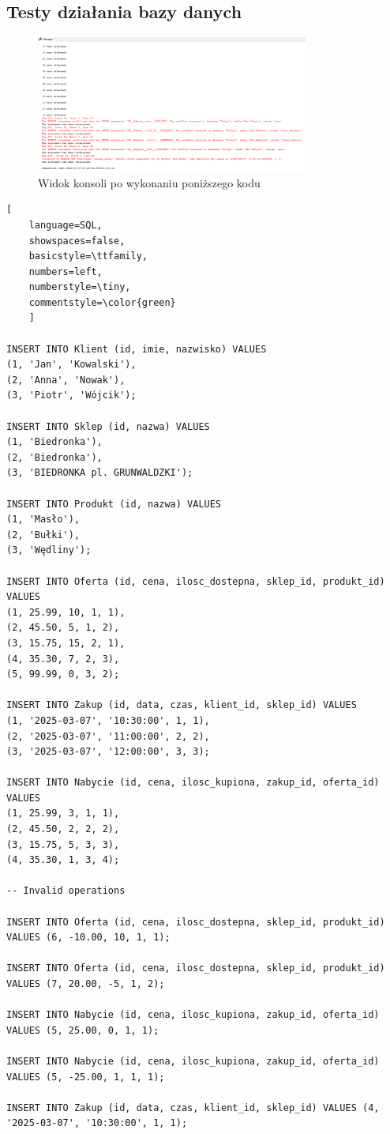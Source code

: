 \documentclass[a4paper,12pt]{article}
\begin{document}
\subsection{Testy działania bazy danych}

\begin{figure}[H]
    \centering
    \includegraphics[width=0.8\textwidth]{images/seeding_console.png}
    \caption{Widok konsoli po wykonaniu poniższego kodu}
    \label{fig:tests}
    \end{figure}

\begin{lstlisting}[
    language=SQL,
    showspaces=false,
    basicstyle=\ttfamily,
    numbers=left,
    numberstyle=\tiny,
    commentstyle=\color{green}
    ]

INSERT INTO Klient (id, imie, nazwisko) VALUES
(1, 'Jan', 'Kowalski'),
(2, 'Anna', 'Nowak'),
(3, 'Piotr', 'Wójcik');

INSERT INTO Sklep (id, nazwa) VALUES
(1, 'Biedronka'),
(2, 'Biedronka'),
(3, 'BIEDRONKA pl. GRUNWALDZKI');

INSERT INTO Produkt (id, nazwa) VALUES
(1, 'Masło'),
(2, 'Bułki'),
(3, 'Wędliny');

INSERT INTO Oferta (id, cena, ilosc_dostepna, sklep_id, produkt_id) VALUES
(1, 25.99, 10, 1, 1),
(2, 45.50, 5, 1, 2),
(3, 15.75, 15, 2, 1),
(4, 35.30, 7, 2, 3),
(5, 99.99, 0, 3, 2);

INSERT INTO Zakup (id, data, czas, klient_id, sklep_id) VALUES
(1, '2025-03-07', '10:30:00', 1, 1),
(2, '2025-03-07', '11:00:00', 2, 2),
(3, '2025-03-07', '12:00:00', 3, 3);

INSERT INTO Nabycie (id, cena, ilosc_kupiona, zakup_id, oferta_id) VALUES
(1, 25.99, 3, 1, 1),
(2, 45.50, 2, 2, 2),
(3, 15.75, 5, 3, 3),
(4, 35.30, 1, 3, 4);

-- Invalid operations

INSERT INTO Oferta (id, cena, ilosc_dostepna, sklep_id, produkt_id) VALUES (6, -10.00, 10, 1, 1);

INSERT INTO Oferta (id, cena, ilosc_dostepna, sklep_id, produkt_id) VALUES (7, 20.00, -5, 1, 2);

INSERT INTO Nabycie (id, cena, ilosc_kupiona, zakup_id, oferta_id) VALUES (5, 25.00, 0, 1, 1);

INSERT INTO Nabycie (id, cena, ilosc_kupiona, zakup_id, oferta_id) VALUES (5, -25.00, 1, 1, 1);

INSERT INTO Zakup (id, data, czas, klient_id, sklep_id) VALUES (4, '2025-03-07', '10:30:00', 1, 1);

\end{lstlisting}
\end{document}
